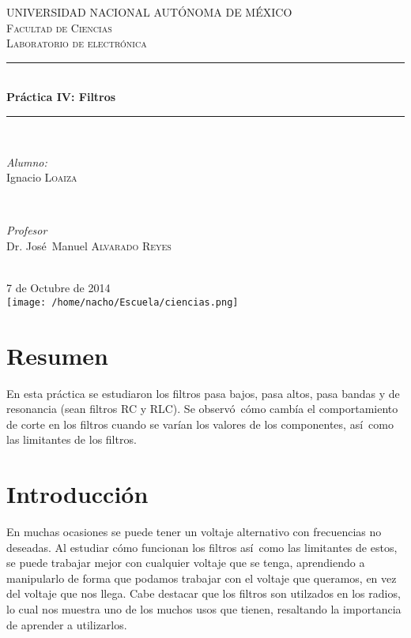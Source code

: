 \documentclass[11pt]{article}
\renewcommand{\=}[1]{\stackrel{#1}{=}} %
\theoremstyle{definition}
\theoremstyle{remark}
\begin{document}
\begin{titlepage}
\newcommand{\HRule}{\rule{\linewidth}{0.5mm}}
\center 
 
\textsc{\LARGE UNIVERSIDAD NACIONAL AUT\'ONOMA DE M\'EXICO}\\[1.5cm] 
\textsc{\Large Facultad de Ciencias}\\[0.5cm] 
\textsc{\large Laboratorio de electr\'onica}\\[0.5cm] 
\HRule \\[0.4cm]
{ \huge \bfseries Pr\'actica IV: Filtros}\\[0.4cm]
\HRule \\[1.5cm]
\begin{minipage}{0.4\textwidth}
\begin{flushleft} \large
\emph{Alumno:}\\
Ignacio \textsc{Loaiza}
\end{flushleft}
\end{minipage}
~
\begin{minipage}{0.4\textwidth}
\begin{flushright} \large
\emph{Profesor} \\
Dr. Jos\'e\ Manuel \textsc{Alvarado Reyes}
\end{flushright}
\end{minipage}\\[3cm]
{\large 7 de Octubre de 2014}\\[0.5cm]
\texttt{[image: /home/nacho/Escuela/ciencias.png]}\\[1cm]
\vfill
\end{titlepage}
\section{Resumen}
En esta pr\'actica se estudiaron los filtros pasa bajos, pasa altos, pasa bandas y de resonancia (sean filtros RC y RLC). Se observ\'o\ c\'omo camb\'ia el comportamiento de corte en los filtros cuando se var\'ian los valores de los componentes, as\'i\ como las limitantes de los filtros.

\section{Introducci\'on}
En muchas ocasiones se puede tener un voltaje alternativo con frecuencias no deseadas. Al estudiar c\'omo funcionan los filtros as\'i\ como las limitantes de estos, se puede trabajar mejor con cualquier voltaje que se tenga, aprendiendo a manipularlo de forma que podamos trabajar con el voltaje que queramos, en vez del voltaje que nos llega. Cabe destacar que los filtros son utilzados en los radios, lo cual nos muestra uno de los muchos usos que tienen, resaltando la importancia de aprender a utilizarlos.
\end{document}
